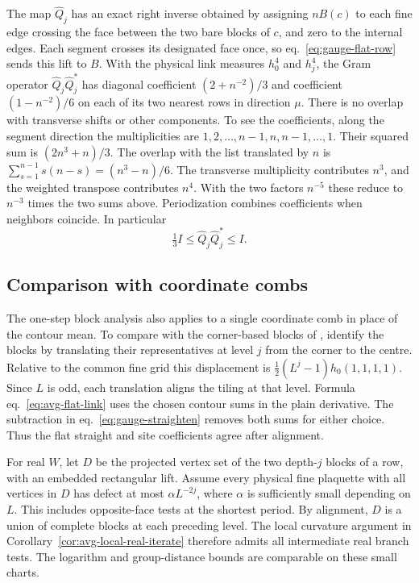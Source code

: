 \documentclass[11pt,letterpaper,reqno]{amsart}
\numberwithin{equation}{section}
\renewcommand{\eqref}[1]{\textup{eq.~\ref{#1}}}
\theoremstyle{definition}
\theoremstyle{remark}
\begin{document}
The map \(\widehat Q_j\) has an exact right inverse obtained by
assigning \(nB(c)\) to each fine edge crossing the face between the
two bare blocks of \(c\), and zero to the internal edges.
Each segment crosses its designated face once, so
\eqref{eq:gauge-flat-row} sends this lift to \(B\).
With the physical link measures \(h_0^4\) and \(h_j^4\), the
Gram operator \(\widehat Q_j\widehat Q_j^\ast\) has diagonal
coefficient \((2+n^{-2})/3\) and coefficient
\((1-n^{-2})/6\) on each of its two nearest rows in direction \(\mu\).
There is no overlap with transverse shifts or other components.
To see the coefficients, along the segment direction the
multiplicities are \(1,2,\ldots,n-1,n,n-1,\ldots,1\).
Their squared sum is \((2n^3+n)/3\).
The overlap with the list translated by \(n\) is
\(\sum_{s=1}^{n-1}s(n-s)=(n^3-n)/6\).
The transverse multiplicity contributes \(n^3\), and the weighted
transpose contributes \(n^4\). With the two factors \(n^{-5}\)
these reduce to \(n^{-3}\) times the two sums above. Periodization
combines coefficients when neighbors coincide. In particular
\[
 \tfrac13 I\le \widehat Q_j\widehat Q_j^\ast\le I .
\]

\subsection{Comparison with coordinate combs}

The one-step block analysis also applies to a single coordinate
comb in place of the contour mean. To compare with the corner-based
blocks of \cite{Bal85a}, identify the blocks by translating their
representatives at level \(j\) from the corner to the centre.
Relative to the common fine grid this displacement is
\(\frac12(L^j-1)h_0(1,1,1,1)\). Since \(L\) is odd, each
translation aligns the tiling at that level. Formula
\eqref{eq:avg-flat-link} uses the chosen contour sums in the
plain derivative. The subtraction in \eqref{eq:gauge-straighten}
removes both sums for either choice. Thus the flat straight and
site coefficients agree after alignment.

For real \(W\), let \(D\) be the projected vertex set of the two
depth-\(j\) blocks of a row, with an embedded rectangular lift.
Assume every physical fine plaquette with all vertices in \(D\)
has defect at most \(\alpha L^{-2j}\), where \(\alpha\) is sufficiently
small depending on \(L\). This includes opposite-face tests at
the shortest period. By alignment, \(D\) is a union of complete
blocks at each preceding level. The local curvature argument in
Corollary~\ref{cor:avg-local-real-iterate} therefore admits all
intermediate real branch tests. The logarithm and group-distance
bounds are comparable on these small charts.
\end{document}
